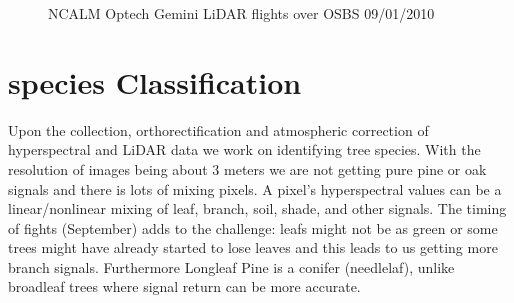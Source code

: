 \documentclass[remotesensing,article,accept,moreauthors,pdftex,12pt,a4paper]{mdpi}
\begin{document}
\begin{figure}[tp]
  \centering
  \hspace{3em}%
   \caption{NCALM Optech Gemini LiDAR flights over OSBS 09/01/2010 \cite{neon2010aopdatarelease}}
 \label{fig:lidar}
\end{figure}



\section{species Classification}

Upon the collection, orthorectification and atmospheric correction of hyperspectral and LiDAR data we work on identifying tree species. 
With the resolution of images being about 3 meters we are not getting pure pine or oak signals and there is lots of mixing pixels. 
A pixel's hyperspectral values can be a linear/nonlinear mixing of leaf, branch, soil, shade, and other signals. 
The timing of fights (September) adds to the challenge: leafs might not be as green or some trees might have already started to lose leaves and this leads to us getting more branch signals. 
Furthermore Longleaf Pine is a conifer (needlelaf), unlike broadleaf trees where signal return can be more accurate. 
\end{document}
